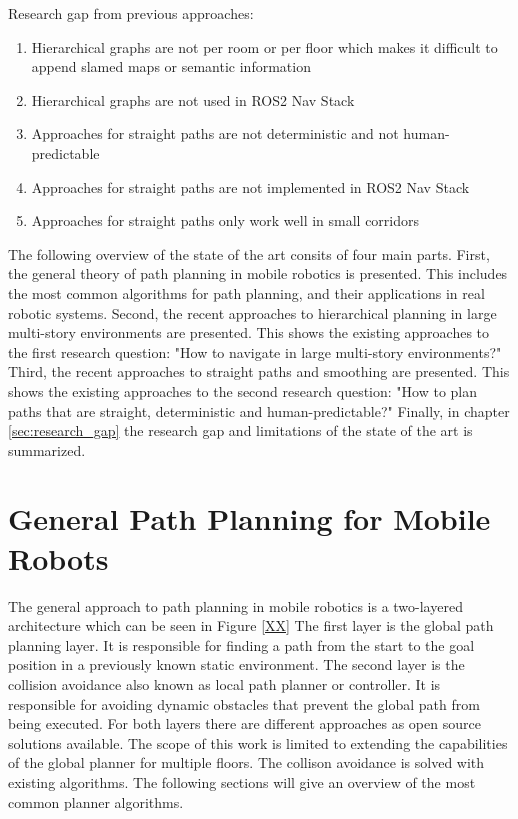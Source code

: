 Research gap from previous approaches:
\begin{enumerate}
    \item Hierarchical graphs are not per room or per floor which makes it difficult to append slamed maps or semantic information
    \item Hierarchical graphs are not used in ROS2 Nav Stack
    \item Approaches for straight paths are not deterministic and not human-predictable
    \item Approaches for straight paths are not implemented in ROS2 Nav Stack
    \item Approaches for straight paths only work well in small corridors
\end{enumerate}

The following overview of the state of the art consits of four main parts. First, the general theory of path planning in mobile robotics is presented. This includes the most common algorithms for path planning, and their applications in real robotic systems. Second, the recent approaches to hierarchical planning in large multi-story environments are presented. This shows the existing approaches to the first research question: "How to navigate in large multi-story environments?" Third, the recent approaches to straight paths and smoothing are presented. This shows the existing approaches to the second research question: "How to plan paths that are straight, deterministic and human-predictable?" Finally, in chapter \ref*{sec:research_gap} the research gap and limitations of the state of the art is summarized.

\section{General Path Planning for Mobile Robots}
\label{sec:path_planning}

The general approach to path planning in mobile robotics is a two-layered architecture which can be seen in Figure \ref{XX}  The first layer is the global path planning layer. It is responsible for finding a path from the start to the goal position in a previously known static environment. The second layer is the collision avoidance also known as local path planner or controller. It is responsible for avoiding dynamic obstacles that prevent the global path from being executed. For both layers there are different approaches as open source solutions available. The scope of this work is limited to extending the capabilities of the global planner for multiple floors. The collison avoidance is solved with existing algorithms. The following sections will give an overview of the most common planner algorithms. 

